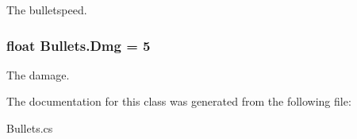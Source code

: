 The bulletspeed. 

\hypertarget{classBullets_acc3d972e4c08788a0aff8b87faf7c3a6}{
\subsubsection[{Dmg}]{\setlength{\rightskip}{0pt plus 5cm}float Bullets.\-Dmg = 5}}\label{classBullets_acc3d972e4c08788a0aff8b87faf7c3a6}


The damage. 



The documentation for this class was generated from the following file\-:\begin{DoxyCompactItemize}
\item 
Bullets.\-cs\end{DoxyCompactItemize}

